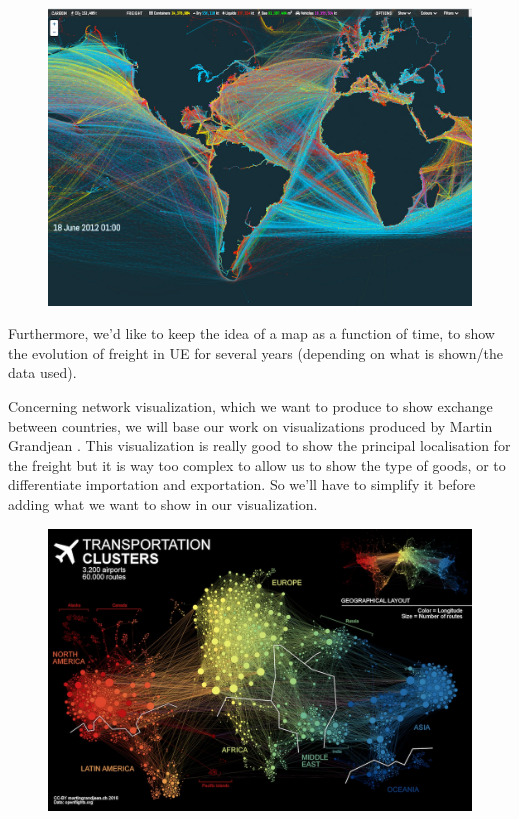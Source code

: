 \documentclass{vgtc}
\begin{document}
\begin{figure}[H]
\center
\includegraphics[scale=0.2]{shipmap.jpg}
\end{figure}

Furthermore, we’d like to keep the idea of a map as a function of time, to show the evolution of freight in UE for several years (depending on what is shown/the data used). 

Concerning network visualization, which we want to produce to show exchange between countries, we will base our work on visualizations produced by Martin Grandjean \cite{airtraffic}. This visualization is really good to show the principal localisation for the freight but it is way too complex to allow us to show the type of goods, or to differentiate importation and exportation. So we’ll have to simplify it before adding what we want to show in our visualization.

\begin{figure}[H]
\center
\includegraphics[scale=0.15]{airports-network-small.jpg}
\end{figure}
\end{document}

